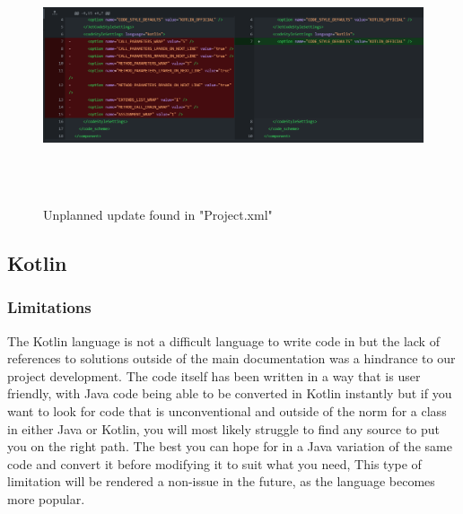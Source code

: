 \begin{figure}[H]
    \centering
    \includegraphics[width=16cm, height = 7.5cm]{img/Unplannedupdate.png}
    \caption{Unplanned update found in "Project.xml"}
    \label{fig:Unplanned update found in "Project.xml"}
\end{figure}

\subsection{Kotlin}
\subsubsection{Limitations}
The Kotlin language is not a difficult language to write code in but the lack of references to solutions outside of the main documentation was a hindrance to our project development. 
\newline
\newline 
The code itself has been written in a way that is user friendly, with Java code being able to be converted in Kotlin instantly but if you want to look for code that is unconventional and outside of the norm for a class in either Java or Kotlin, you will most likely struggle to find any source to put you on the right path. 
\newline
\newline 
The best you can hope for in a Java variation of the same code and \newline convert it before modifying it to suit what you need,
This type of limitation will be rendered a non-issue in the future, as the language becomes more popular. 
\newpage

